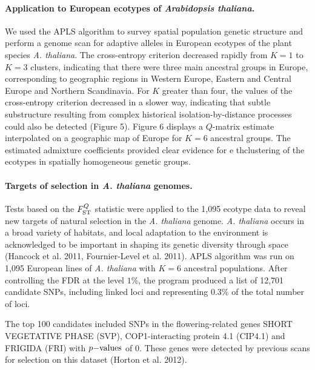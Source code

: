  
\paragraph{Application to European ecotypes of {\it Arabidopsis  thaliana}.} We used  the APLS algorithm to survey spatial population genetic structure and perform a genome scan for adaptive alleles in European ecotypes of the plant species {\it A.  thaliana}. The cross-entropy criterion decreased rapidly from $K=1$ to $K=3$ clusters,  indicating  that  there were three 
main ancestral groups in Europe, corresponding to geographic regions in Western Europe, Eastern and Central Europe and Northern Scandinavia. For $K$ greater than four, the values of the cross-entropy criterion decreased in a slower way, indicating that subtle substructure resulting from complex historical isolation-by-distance  processes could also be detected (Figure 5). 
Figure 6 displays a $Q$-matrix estimate  interpolated on a geographic map of Europe for $K = 6$ ancestral groups. The estimated admixture coefficients provided clear evidence for e thclustering of the ecotypes in spatially homogeneous genetic groups. 

\paragraph{Targets of selection in {\it A.  thaliana} genomes.}  Tests based on the $F^Q_{\rm ST}$  statistic were applied to the 1,095 ecotype data to reveal new targets of natural selection in the {\it A. thaliana} genome. {\it A. thaliana} occurs in a broad variety of habitats, and local adaptation to the environment is acknowledged to be important in shaping its genetic diversity through space (Hancock et al. 2011, Fournier-Level et al. 2011). 
APLS algorithm was run on 1,095 European lines of {\it A. thaliana} with $K=6$ ancestral populations. After controlling the FDR at the level $1\%$, the program produced a list of 12,701 candidate SNPs, including linked loci and representing 0.3\% of the total number of loci. 
 
 The top 100 candidates included SNPs in the flowering-related genes SHORT VEGETATIVE PHASE (SVP), COP1-interacting protein 4.1 (CIP4.1) and FRIGIDA (FRI) with $p{\rm -values}$ of 0. 
 These genes were detected by previous scans for selection on this dataset (Horton et al. 2012).
 
